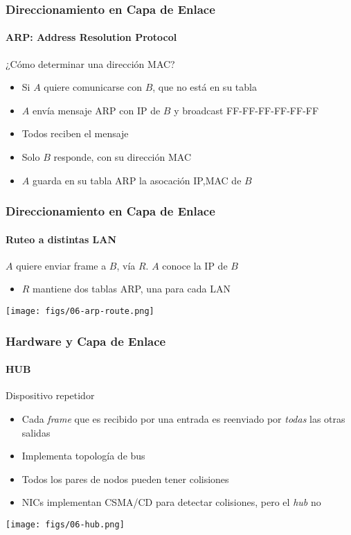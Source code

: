 \documentclass[letter]{beamer}
\begin{document}
\begin{frame}
  \frametitle{Direccionamiento en Capa de Enlace}
  \framesubtitle{ARP: Address Resolution Protocol}

  ¿Cómo determinar una dirección MAC?
  \begin{itemize}
    \item Si $A$ quiere comunicarse con $B$, que no está en su tabla
    \item $A$ envía mensaje ARP con IP de $B$ y broadcast FF-FF-FF-FF-FF-FF
    \item Todos reciben el mensaje
    \item Solo $B$ responde, con su dirección MAC
    \item $A$ guarda en su tabla ARP la asocación IP,MAC de $B$
  \end{itemize}

\end{frame}
\begin{frame}
  \frametitle{Direccionamiento en Capa de Enlace}
  \framesubtitle{Ruteo a distintas LAN}

  $A$ quiere enviar frame a $B$, vía $R$. $A$ conoce la IP de $B$
  \begin{itemize}
    \item $R$ mantiene dos tablas ARP, una para cada LAN
  \end{itemize}

  \begin{center}
    \texttt{[image: figs/06-arp-route.png]}
  \end{center}

\end{frame}

\begin{frame}
  \frametitle{Hardware y Capa de Enlace}
  \framesubtitle{HUB}

  Dispositivo repetidor
  \begin{itemize}
    \item Cada {\em frame} que es recibido por una entrada es reenviado por {\em todas} las otras salidas
    \item Implementa topología de bus
    \item Todos los pares de nodos pueden tener colisiones
    \item NICs implementan CSMA/CD para detectar colisiones, pero el {\em hub} no  
  \end{itemize}

  \begin{center}
    \texttt{[image: figs/06-hub.png]}
  \end{center}


\end{frame}
\end{document}
